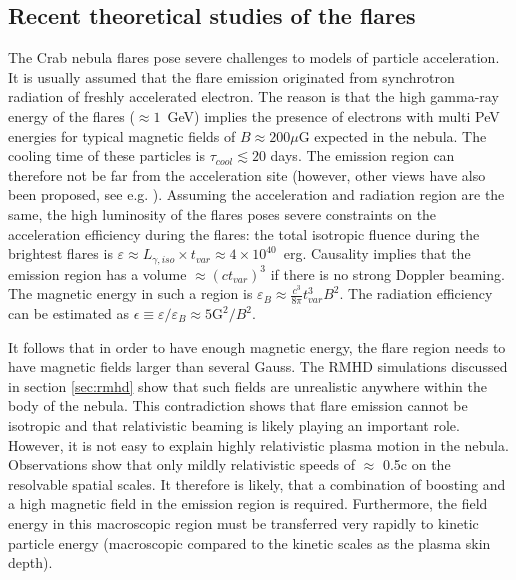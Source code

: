 \subsection{Recent theoretical studies of the flares}

The Crab nebula flares pose severe challenges to models of particle acceleration. It is usually assumed that the flare emission originated from synchrotron radiation of freshly accelerated electron. The reason is that the high gamma-ray energy of the flares ($\approx 1$~GeV) implies the presence of electrons with multi PeV energies for typical magnetic fields of $B \approx 200 \mu$G expected in the nebula. The cooling time of these particles is $\tau_{cool} \lesssim 20$ days. The emission region can therefore not be far from the acceleration site  (however, other views have also been proposed, see e.g. \citet{Bykov_2012,2015arXiv151205426Z}). Assuming the acceleration and radiation region are the same, the high luminosity of the flares poses severe constraints on the acceleration efficiency during the flares: the total isotropic fluence during the brightest flares is $\varepsilon \approx L_{\gamma,iso} \times t_{var} \approx 4 \times 10^{40} $~erg. Causality implies that the emission region has a volume $\approx (c t_{var})^3$ if there is no strong Doppler beaming. The magnetic energy in such a region is $\varepsilon_B \approx \frac{c^3}{8 \pi} t_{var}^3 B^2$. The radiation efficiency can be estimated as $\epsilon \equiv \varepsilon / \varepsilon_B \approx  5 \textrm{G}^2 / B^2$. 

It follows that in order to have enough magnetic energy, the flare region needs to have magnetic fields larger than several Gauss. The RMHD simulations discussed in section \ref{sec:rmhd} show that such fields are unrealistic anywhere within the body of the nebula.  This contradiction shows that flare emission cannot be isotropic and that relativistic beaming is likely playing an important role. However, it is not easy to explain highly relativistic plasma motion in the nebula. Observations show that only mildly relativistic speeds of $\approx$ 0.5c on the resolvable spatial scales. It therefore is likely, that a combination of boosting and a high magnetic field in the emission region is required. Furthermore, the field energy in this macroscopic region must be transferred very rapidly to kinetic particle energy (macroscopic compared to the kinetic scales as the plasma skin depth). 

